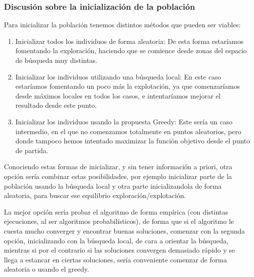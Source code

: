 \subsubsection{Discusión sobre la inicialización de la población}

Para inicializar la población tenemos distintos métodos que pueden ser viables:

\begin{enumerate}
	\item Inicializar todos los individuos de forma aleatoria: De esta forma estaríamos fomentando la exploración, haciendo que se comience desde zonas del espacio de búsqueda muy distintas.
	\item Inicializar los individuos utilizando una búsqueda local: En este caso estaríamos fomentando un poco más la explotación, ya que comenzaríamos desde máximos locales en todos los casos, e intentaríamos mejorar el resultado desde este punto.
	\item Inicializar los individuos usando la propuesta Greedy: Este sería un caso intermedio, en el que no comenzamos totalmente en puntos aleatorios, pero donde tampoco hemos intentado maximizar la función objetivo desde el punto de partida.
\end{enumerate}

Conociendo estas formas de inicializar, y sin tener información a priori, otra opción sería combinar estas posibilidades, por ejemplo inicializar parte de la población usando la búsqueda local y otra parte inicializandola de forma aleatoria, para buscar ese equilibrio exploración/explotación.

La mejor opción sería probar el algoritmo de forma empírica (con distintas ejecuciones, al ser algoritmos probabilísticos), de forma que si el algoritmo le cuesta mucho converger y encontrar buenas soluciones, comenzar con la segunda opción, inicializando con la búsqueda local, de cara a orientar la búsqueda, mientras si por el contrario si las soluciones convergen demasiado rápido y se llega a estancar en ciertas soluciones, sería conveniente comenzar de forma aleatoria o usando el greedy.
